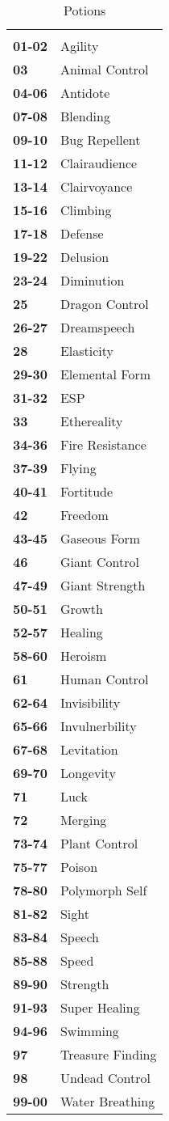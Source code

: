 \begin{multicols*}{2}
\begin {table}[H]
  \caption{Potions}
  \begin{tabularx}{\columnwidth}{>{\bfseries}YY}
	 & \\
	01-02 & Agility\\
	03 & Animal Control\\
	04-06 & Antidote\\
	07-08 & Blending\\
	09-10 & Bug Repellent\\
	11-12 & Clairaudience\\
	13-14 & Clairvoyance\\
	15-16 & Climbing\\
	17-18 & Defense\\
	19-22 & Delusion\\
	23-24 & Diminution\\
	25 & Dragon Control\\
	26-27 & Dreamspeech\\
	28 & Elasticity\\
	29-30 & Elemental Form\\
	31-32 & ESP\\
	33 & Ethereality\\
	34-36 & Fire Resistance\\
	37-39 & Flying\\
	40-41 & Fortitude\\
	42 & Freedom\\
	43-45 & Gaseous Form\\
	46 & Giant Control\\
	47-49 & Giant Strength\\
	50-51 & Growth\\
	52-57 & Healing\\
	58-60 & Heroism\\
	61 & Human Control\\
	62-64 & Invisibility\\
	65-66 & Invulnerbility\\
	67-68 & Levitation\\
	69-70 & Longevity\\
	71 & Luck\\
	72 & Merging\\
	73-74 & Plant Control\\
	75-77 & Poison\\
	78-80 & Polymorph Self\\
	81-82 & Sight\\
	83-84 & Speech\\
	85-88 & Speed\\
	89-90 & Strength\\
	91-93 & Super Healing\\
	94-96 & Swimming\\
	97 & Treasure Finding\\
	98 & Undead Control\\
	99-00 & Water Breathing
  \end {tabularx}
\end {table}


\end{multicols*}

